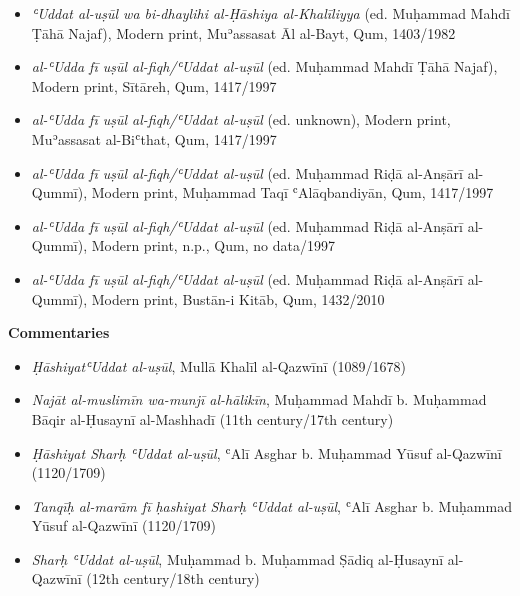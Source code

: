 \documentclass{article}
\begin{document}
\begin{enumerate}
\begin{itemize}
        \item \emph{ʿUddat al-uṣūl wa bi-dhaylihi al-Ḥāshiya al-Khalīliyya} (ed. Muḥammad Mahdī Ṭāhā Najaf), Modern print, Muʾassasat Āl al-Bayt, Qum, 1403/1982
        
        \item \emph{al-ʿUdda fī uṣūl al-fiqh/ʿUddat al-uṣūl} (ed. Muḥammad Mahdī Ṭāhā Najaf), Modern print, Sītāreh, Qum, 1417/1997
        
        \item \emph{al-ʿUdda fī uṣūl al-fiqh/ʿUddat al-uṣūl} (ed. unknown), Modern print, Muʾassasat al-Biʿthat, Qum, 1417/1997
        
        \item \emph{al-ʿUdda fī uṣūl al-fiqh/ʿUddat al-uṣūl} (ed. Muḥammad Riḍā al-Anṣārī al-Qummī), Modern print, Muḥammad Taqī ʿAlāqbandiyān, Qum, 1417/1997
        
        \item \emph{al-ʿUdda fī uṣūl al-fiqh/ʿUddat al-uṣūl} (ed. Muḥammad Riḍā al-Anṣārī al-Qummī), Modern print, n.p., Qum, no data/1997
        
        \item \emph{al-ʿUdda fī uṣūl al-fiqh/ʿUddat al-uṣūl} (ed. Muḥammad Riḍā al-Anṣārī al-Qummī), Modern print, Bustān-i Kitāb, Qum, 1432/2010
        \end{itemize}
\textbf{Commentaries}
\begin{itemize}
              \item \emph{ḤāshiyatʿUddat al-uṣūl}, Mullā Khalīl al-Qazwīnī (1089/1678)
            
              \item \emph{Najāt al-muslimīn wa-munjī al-hālikīn}, Muḥammad Mahdī b. Muḥammad Bāqir al-Ḥusaynī al-Mashhadī (11th century/17th century)
            
              \item \emph{Ḥāshiyat Sharḥ ʿUddat al-uṣūl}, ʿAlī Asghar b. Muḥammad Yūsuf al-Qazwīnī (1120/1709)
            
              \item \emph{Tanqīḥ al-marām fī ḥashiyat Sharḥ ʿUddat al-uṣūl}, ʿAlī Asghar b. Muḥammad Yūsuf al-Qazwīnī (1120/1709)
            
              \item \emph{Sharḥ ʿUddat al-uṣūl}, Muḥammad b. Muḥammad Ṣādiq al-Ḥusaynī al-Qazwīnī (12th century/18th century)
            \end{itemize}


\end{enumerate}
\end{document}
